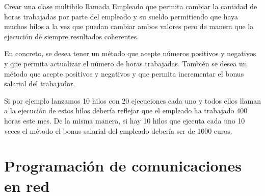 \documentclass[letterpaper,10pt,spanish]{sphinxmanual}
\begin{document}
Crear una clase multihilo llamada Empleado que permita cambiar la cantidad de horas trabajadas por parte del empleado y su sueldo permitiendo que haya muchos hilos a la vez que puedan cambiar ambos valores pero de manera que la ejecución dé siempre resultados coherentes.

En concreto, se desea tener un método  que acepte números positivos y negativos y que permita actualizar el número de horas trabajadas. También se desea un método  que acepte positivos y negativos y que permita incrementar el bonus salarial del trabajador.

Si por ejemplo lanzamos 10 hilos con 20 ejecuciones cada uno y todos ellos llaman a  la ejecución de estos hilos debería reflejar que el empleado ha trabajado 400 horas este mes. De la misma manera, si hay 10 hilos que ejecuta cada uno 10 veces el método  el bonus salarial del empleado debería ser de 1000 euros.

%
\begin{sphinxVerbatim}[commandchars=\\\{\}]
   
         
         
            
            
\end{sphinxVerbatim}


\chapter{Programación de comunicaciones en red}
\label{\detokenize{textos/tema3:programacion-de-comunicaciones-en-red}}\label{\detokenize{textos/tema3::doc}}
\end{document}
